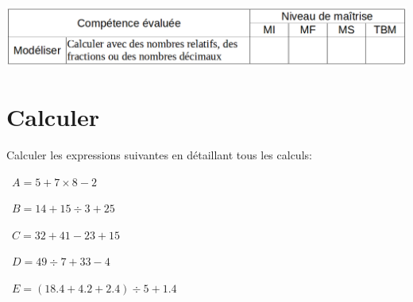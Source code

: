 	\includegraphics[scale=0.4]{competences}
	
	\section{Calculer}
	Calculer les expressions suivantes en détaillant tous les calculs:
	\begin{questions}
		
	
		\question[2]  $A = 5 + 7 \times 8 - 2$
		
		\fillwithdottedlines{6cm}
			 
		\question[2]  $B = 14 + 15 \div 3 + 25$
		
		\fillwithdottedlines{6cm}
		
			\newpage
		
		\question[2]  $C = 32 + 41 - 23 + 15$
		
		\fillwithdottedlines{6cm}
		
	
		
		\question[2]  $D = 49 \div 7 + 33 - 4$
		
		\fillwithdottedlines{6cm}
		
		\question[2]  $E = (\num{18.4} + \num{4.2} + \num{2.4}) \div 5 + \num{1.4}$
		
		\fillwithdottedlines{6cm}
		
	\end{questions}
	
	
